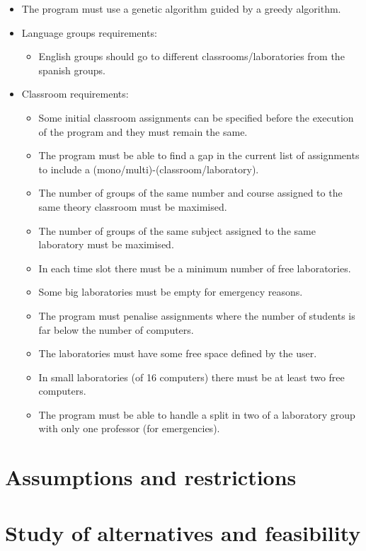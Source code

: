 \begin{itemize}
    \item The program must use a genetic algorithm guided by a greedy algorithm.
    \item Language groups requirements:
        \begin{itemize}
            \item English groups should go to different classrooms/laboratories from the spanish groups.
        \end{itemize}
    \item Classroom requirements:
        \begin{itemize}
            \item Some initial classroom assignments can be specified before the execution of the program and they must remain the same.
            \item The program must be able to find a gap in the current list of assignments to include a (mono/multi)-(classroom/laboratory).
            \item The number of groups of the same number and course assigned to the same theory classroom must be maximised.
            \item The number of groups of the same subject assigned to the same laboratory must be maximised.
            \item In each time slot there must be a minimum number of free laboratories.
            \item Some big laboratories must be empty for emergency reasons.
            \item The program must penalise assignments where the number of students is far below the number of computers.
            \item The laboratories must have some free space defined by the user.
            \item In small laboratories (of 16 computers) there must be at least two free computers.
            \item The program must be able to handle a split in two of a laboratory group with only one professor (for emergencies).
        \end{itemize}
\end{itemize}

\section{Assumptions and restrictions}
\section{Study of alternatives and feasibility}
